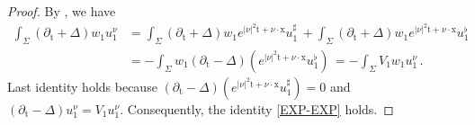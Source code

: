\documentclass[10pt,a4paper]{amsart}
\newcommand{\tm}{\mathrm{t}}
\newcommand{\x}{\mathrm{x}}
\begin{document}
\begin{proof}
By , we have
\begin{align*}
\int_{\Sigma}\left( \partial_{\tm}+\Delta\right) w_1 u_1^{\nu} &=
\int_{\Sigma}\left( \partial_{\tm}+\Delta\right) w_1 e^{|\nu|^2 \tm + \nu \cdot \x} u_1^\sharp \, + \int_{\Sigma}\left( \partial_{\tm}+\Delta\right) w_1 e^{|\nu|^2 \tm + \nu \cdot \x} u_1^\flat \, \\
&= - \int_{\Sigma} w_1 \left( \partial_{\tm}-\Delta\right) (e^{|\nu|^2 \tm + \nu \cdot \x} u_1^\flat) \, = - \int_{\Sigma} V_1 w_1 u_1^{\nu} \, .
\end{align*}
Last identity holds because 
$\left( \partial_{\tm} - \Delta\right)(e^{|\nu|^2 \tm + \nu \cdot \x} u_1^\sharp) = 0$ and
$\left( \partial_{\tm} - \Delta\right) u_1^\nu = V_1 u_1^\nu$. Consequently, the identity \eqref{EXP-EXP} holds.
\end{proof}
\end{document}
